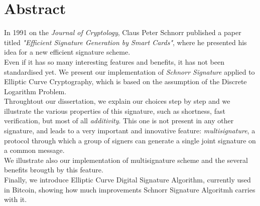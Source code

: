 \newpage
\chapter*{Abstract}
In 1991 on the \textit{Journal of Cryptology}, Claus Peter Schnorr published a paper titled \textit{"Efficient Signature Generation by Smart Cards"}, where he presented his idea for a new efficient signature scheme.\\
Even if it has so many interesting features and benefits, it has not been standardised yet. We present our implementation of \textit{Schnorr Signature} applied to Elliptic Curve Cryptography, which is based on the assumption of the Discrete Logarithm Problem.\\
Throughtout our dissertation, we explain our choices step by step and we illustrate the various properties of this signature, such as shortness, fast verification, but most of all \textit{additivity}. This one is not present in any other signature, and leads to a very important and innovative feature: \textit{multisignature}, a protocol through which a group of signers can generate a single joint signature on a common message.\\
We illustrate also our implementation of multisignature scheme and the several benefits brougth by this feature.\\
Finally, we introduce Elliptic Curve Digital Signature Algorithm, currently used in Bitcoin, showing how much improvements Schnorr Signature Algoritmh carries with it.